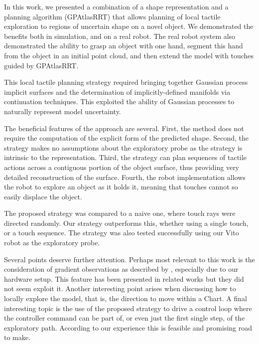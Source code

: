 In this work, we presented a combination of a shape representation and a planning algorithm (GPAtlasRRT) that allows planning of local tactile exploration to regions of uncertain shape on a novel object. We demonstrated the benefits both in simulation, and on a real robot. The real robot system also demonstrated the ability to grasp an object with one hand, segment this hand from the object in an initial point cloud, and then extend the model with touches guided by GPAtlasRRT.

This local tactile planning strategy required bringing together Gaussian process implicit surfaces and the determination of implicitly-defined manifolds via continuation techniques. This exploited the ability of Gaussian processes to naturally represent model uncertainty. 

The beneficial features of the approach are several. First, the method does not require the computation of the explicit form of the predicted shape. Second, the strategy makes no assumptions about the exploratory probe as the strategy is intrinsic to the representation. Third, the strategy can plan sequences of tactile actions across a contiguous portion of the object surface, thus providing very detailed reconstruction of the surface. Fourth, the robot implementation allows the robot to explore an object as it holds it, meaning that touches cannot so easily displace the object.

The proposed strategy was compared to a naive one, where touch rays were directed randomly. Our strategy outperforms this, whether using a single touch, or a touch sequence. The strategy was also tested successfully using our Vito robot as the exploratory probe.

Several points deserve further attention. Perhaps most relevant to this work is the consideration of gradient observations as described by \cite{Solak2003Derivative}, especially due to our hardware setup. This feature has been presented in related works but they did not seem exploit it. Another interesting point arises when discussing how to locally explore the model, that is, the direction to move within a Chart. 
A final interesting topic is the use of the proposed strategy to drive a control loop where the controller command can be part of, or even just the first single step, of the exploratory path. According to our experience this is feasible and promising road to make.
